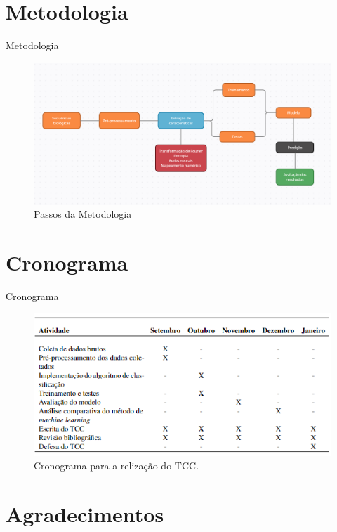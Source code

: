 \documentclass{apresentacao-ifb}
\begin{document}
\section{Metodologia}

\begin{frame}{Metodologia}
\begin{figure}[h]
\centering
  \caption[Fluxograma de atividades] { Passos da Metodologia}
  \includegraphics[width=\columnwidth]{fluxograma.png}
  
  \label{fig:research-methodology-thesis}
\end{figure}
\end{frame}

\section{Cronograma}

\begin{frame}{Cronograma}
   \begin{figure}[h]
    \centering
    \includegraphics[width=.7\textwidth]{cronograma.png}
    \caption{Cronograma para a relização do TCC.}
    \end{figure}
\end{frame}

\section{Agradecimentos}
\end{document}
